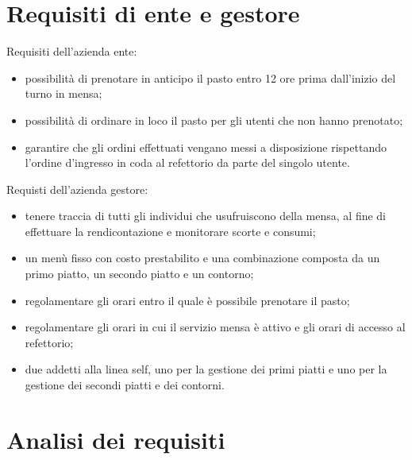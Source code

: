 \documentclass[a4paper, titlepage, 12pt, openright, oneside]{book}
\begin{document}
\section{Requisiti di ente e gestore}

Requisiti dell'azienda ente:
\begin{itemize}
	\item possibilità di prenotare in anticipo il pasto entro 12 ore prima dall'inizio del turno in mensa;
	\item possibilità di ordinare in loco il pasto per gli utenti che non hanno prenotato;
	\item garantire che gli ordini effettuati vengano messi a disposizione rispettando l'ordine d'ingresso in coda al refettorio da parte del singolo utente.
\end{itemize}

Requisti dell'azienda gestore:
\begin{itemize}
	\item tenere traccia di tutti gli individui che usufruiscono della mensa, al fine di effettuare la rendicontazione e monitorare scorte e consumi;
	\item un menù fisso con costo prestabilito e una combinazione composta da un primo piatto, un secondo piatto e un contorno;
	\item regolamentare gli orari entro il quale è possibile prenotare il pasto;
	\item regolamentare gli orari in cui il servizio mensa è attivo e gli orari di accesso al refettorio;
	\item due addetti alla linea self, uno per la gestione dei primi piatti e uno per la gestione dei secondi piatti e dei contorni.
\end{itemize}

\section{Analisi dei requisiti}
\end{document}
